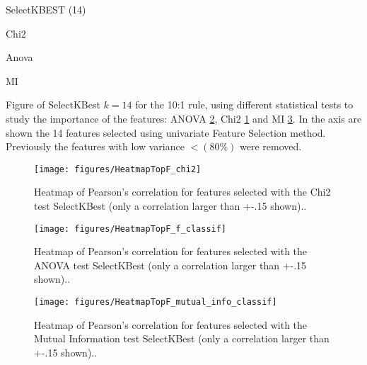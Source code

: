 \documentclass[preprint,12pt]{elsarticle}
\begin{document}
SelectKBEST (14)

Chi2
      

Anova 

MI 

Figure of SelectKBest $k=14$ for the 10:1 rule, using different statistical tests to study the importance of the features: ANOVA \ref{fig:HeatmapTopF_f_classif-b}, Chi2 \ref{fig:HeatmapF_chi2-b} and MI \ref{fig:HeatmapTopF_mutual_info_classif-b}.
In the axis are shown the 14 features selected using univariate Feature Selection method. Previously the features with low variance $<(80\%)$ were removed.

\begin{figure}[!htb]
        \centering
        \texttt{[image: figures/HeatmapTopF\_chi2]}
        \caption{Heatmap of Pearson's correlation for features selected with the Chi2 test SelectKBest \cite{scikit-learn} (only a correlation larger than +-.15 shown)..} 
        \label{fig:HeatmapF_chi2-b}
\end{figure}

\begin{figure}[!htb]
        \centering
        \texttt{[image: figures/HeatmapTopF\_f\_classif]}
        \caption{Heatmap of Pearson's correlation for features selected with the ANOVA test SelectKBest \cite{scikit-learn} (only a correlation larger than +-.15 shown)..} 
        \label{fig:HeatmapTopF_f_classif-b}
\end{figure}

\begin{figure}[!htb]
        \centering
        \texttt{[image: figures/HeatmapTopF\_mutual\_info\_classif]}
        \caption{Heatmap of Pearson's correlation for features selected with the Mutual Information test SelectKBest \cite{scikit-learn} (only a correlation larger than +-.15 shown)..} 
        \label{fig:HeatmapTopF_mutual_info_classif-b}
\end{figure}
\end{document}
